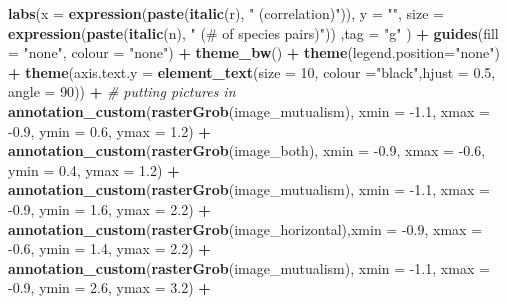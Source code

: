 \documentclass[
]{article}
\newenvironment{Shaded}{\begin{snugshade}}{\end{snugshade}}
\newcommand{\CommentTok}[1]{\textcolor[rgb]{0.56,0.35,0.01}{\textit{#1}}}
\newcommand{\DataTypeTok}[1]{\textcolor[rgb]{0.13,0.29,0.53}{#1}}
\newcommand{\DecValTok}[1]{\textcolor[rgb]{0.00,0.00,0.81}{#1}}
\newcommand{\FloatTok}[1]{\textcolor[rgb]{0.00,0.00,0.81}{#1}}
\newcommand{\KeywordTok}[1]{\textcolor[rgb]{0.13,0.29,0.53}{\textbf{#1}}}
\newcommand{\NormalTok}[1]{#1}
\newcommand{\OperatorTok}[1]{\textcolor[rgb]{0.81,0.36,0.00}{\textbf{#1}}}
\newcommand{\StringTok}[1]{\textcolor[rgb]{0.31,0.60,0.02}{#1}}
\begin{document}
\begin{Shaded}
\begin{Highlighting}[]
{{{\StringTok{  }\KeywordTok{labs}\NormalTok{(}\DataTypeTok{x =} \KeywordTok{expression}\NormalTok{(}\KeywordTok{paste}\NormalTok{(}\KeywordTok{italic}\NormalTok{(r), }\StringTok{" (correlation)"}\NormalTok{)), }\DataTypeTok{y =} \StringTok{""}\NormalTok{, }\DataTypeTok{size =} \KeywordTok{expression}\NormalTok{(}\KeywordTok{paste}\NormalTok{(}\KeywordTok{italic}\NormalTok{(n), }\StringTok{" (# of species pairs)"}\NormalTok{)) ,}\DataTypeTok{tag =} \StringTok{"g"}\NormalTok{ ) }\OperatorTok{+}
\StringTok{  }\KeywordTok{guides}\NormalTok{(}\DataTypeTok{fill =} \StringTok{"none"}\NormalTok{, }\DataTypeTok{colour =} \StringTok{"none"}\NormalTok{) }\OperatorTok{+}
\StringTok{  }\KeywordTok{theme_bw}\NormalTok{() }\OperatorTok{+}
\StringTok{  }\KeywordTok{theme}\NormalTok{(}\DataTypeTok{legend.position=}\StringTok{"none"}\NormalTok{) }\OperatorTok{+}
\StringTok{  }\KeywordTok{theme}\NormalTok{(}\DataTypeTok{axis.text.y =} \KeywordTok{element_text}\NormalTok{(}\DataTypeTok{size =} \DecValTok{10}\NormalTok{, }\DataTypeTok{colour =}\StringTok{"black"}\NormalTok{,}\DataTypeTok{hjust =} \FloatTok{0.5}\NormalTok{, }\DataTypeTok{angle =} \DecValTok{90}\NormalTok{)) }\OperatorTok{+}
\StringTok{  }\CommentTok{# putting pictures in}
\StringTok{  }\KeywordTok{annotation_custom}\NormalTok{(}\KeywordTok{rasterGrob}\NormalTok{(image_mutualism), }\DataTypeTok{xmin =} \FloatTok{-1.1}\NormalTok{, }\DataTypeTok{xmax =} \FloatTok{-0.9}\NormalTok{, }\DataTypeTok{ymin =} \FloatTok{0.6}\NormalTok{, }\DataTypeTok{ymax =} \FloatTok{1.2}\NormalTok{) }\OperatorTok{+}\StringTok{ }
\StringTok{  }\KeywordTok{annotation_custom}\NormalTok{(}\KeywordTok{rasterGrob}\NormalTok{(image_both), }\DataTypeTok{xmin =} \FloatTok{-0.9}\NormalTok{, }\DataTypeTok{xmax =} \FloatTok{-0.6}\NormalTok{, }\DataTypeTok{ymin =} \FloatTok{0.4}\NormalTok{, }\DataTypeTok{ymax =} \FloatTok{1.2}\NormalTok{) }\OperatorTok{+}\StringTok{ }
\StringTok{  }\KeywordTok{annotation_custom}\NormalTok{(}\KeywordTok{rasterGrob}\NormalTok{(image_mutualism), }\DataTypeTok{xmin =} \FloatTok{-1.1}\NormalTok{, }\DataTypeTok{xmax =} \FloatTok{-0.9}\NormalTok{, }\DataTypeTok{ymin =} \FloatTok{1.6}\NormalTok{, }\DataTypeTok{ymax =} \FloatTok{2.2}\NormalTok{) }\OperatorTok{+}
\StringTok{  }\KeywordTok{annotation_custom}\NormalTok{(}\KeywordTok{rasterGrob}\NormalTok{(image_horizontal),}\DataTypeTok{xmin =} \FloatTok{-0.9}\NormalTok{, }\DataTypeTok{xmax =} \FloatTok{-0.6}\NormalTok{, }\DataTypeTok{ymin =} \FloatTok{1.4}\NormalTok{, }\DataTypeTok{ymax =} \FloatTok{2.2}\NormalTok{) }\OperatorTok{+}
\StringTok{  }\KeywordTok{annotation_custom}\NormalTok{(}\KeywordTok{rasterGrob}\NormalTok{(image_mutualism), }\DataTypeTok{xmin =} \FloatTok{-1.1}\NormalTok{, }\DataTypeTok{xmax =} \FloatTok{-0.9}\NormalTok{, }\DataTypeTok{ymin =} \FloatTok{2.6}\NormalTok{, }\DataTypeTok{ymax =} \FloatTok{3.2}\NormalTok{) }\OperatorTok{+}\StringTok{ }
}}}
\end{Highlighting}
\end{Shaded}
\end{document}

